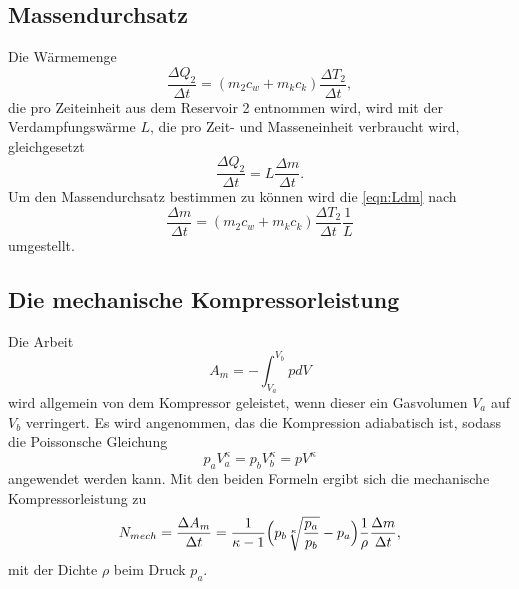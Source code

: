  \subsection{Massendurchsatz} %
 \label{sub:Massendurchsatz}
 Die Wärmemenge 
 \begin{equation}
     \frac{\Delta Q_2}{\Delta t} = (m_2 c_w + m_k c_k)\frac{\Delta T_2}{\Delta t},
     \label{eqn:DeltaQ2}
 \end{equation}
die pro Zeiteinheit aus dem Reservoir 2 entnommen wird,
wird mit der Verdampfungswärme $L$, die pro Zeit- und Masseneinheit verbraucht wird, gleichgesetzt
\begin{equation}
    \frac{\Delta Q_2}{\Delta t} = L \frac{\Delta m}{\Delta t}.
    \label{eqn:Ldm}
\end{equation}
Um den Massendurchsatz bestimmen zu können wird die \autoref{eqn:Ldm} nach
\begin{equation}
    \frac{\Delta m}{\Delta t} = (m_2 c_w + m_k c_k)\frac{\Delta T_2}{\Delta t} \frac{1}{L}
    \label{eqn:Massendurchsatz}
\end{equation}
umgestellt.

\subsection{Die mechanische Kompressorleistung} %
\label{sub:Die mechanische Kompressorleistung}
Die Arbeit 
 \begin{equation*}
     A_m = - \int_{V_a}^{V_b} p dV
 \end{equation*}
wird allgemein von dem Kompressor geleistet, wenn dieser ein Gasvolumen $V_a$ auf $V_b$ verringert.
Es wird angenommen, das die Kompression adiabatisch ist, sodass die Poissonsche Gleichung 
 \begin{equation*}
     p_a V_a^{\kappa} = p_b V_b^{\kappa} = p V^{\kappa}
 \end{equation*}
angewendet werden kann.
Mit den beiden Formeln ergibt sich die mechanische Kompressorleistung zu
\begin{equation}
    N_{mech} = \frac{\Delta A_m}{\Delta t} = \frac{1}{\kappa - 1} \Bigl(p_b \sqrt[\kappa]{\frac{p_a}{p_b}}-p_a \Bigr) \frac{1}{\rho}\frac{\Delta m}{\Delta t},
    \label{eqn:Kompressorleistung}
\end{equation}
mit der Dichte $\rho$ beim Druck $p_a$.
